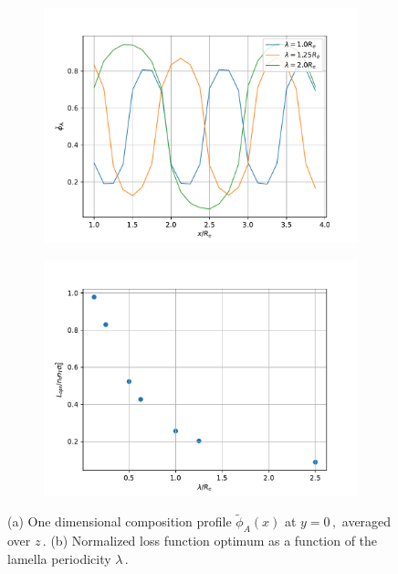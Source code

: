 \documentclass[bachelor,       %
               twoside,        %
               BCOR10mm,       %
               ngerman, english %
               ]{GAUBM}
\begin{document}
\begin{figure}[h]
  \centering
  \begin{subfigure}[b]{0.45\textwidth}
      \centering
      \includegraphics[width=\textwidth]{figures/amplitude_lamella_per.pdf}
      \caption{}
      \label{fig:amplitude_lamella_per}
  \end{subfigure}
    \hfill
  \begin{subfigure}[b]{0.45\textwidth}
      \centering
      \includegraphics[width=\textwidth]{Thesis/figures/L_lambda.pdf}
      \caption{}
      \label{fig:L-lambda}
  \end{subfigure}
     \caption{(a) One dimensional composition profile $\tilde\phi_A(x)$ at $y=0\,,$ averaged over $z\,.$ (b) Normalized loss function optimum as a function of the lamella periodicity $\lambda\,.$}
     \label{fig:periodicity-lossfunction}
\end{figure}
\end{document}
